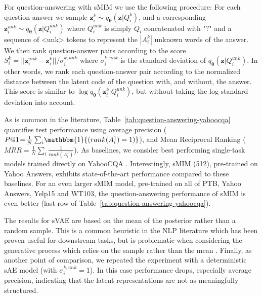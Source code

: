\documentclass{article}
\newcommand{\bs}{\boldsymbol}
\newcommand{\z}{{\bs z}}
\newcommand{\params}{{\bs \theta}}
\newcommand{\penc}{q}
\newcommand{\Menc}{\penc_{\params}}
\begin{document}
For question-answering with sMIM we use the following procedure:
For each question-answer we sample $\z_i^k \sim \Menc(\z|Q_i^k)$, and a corresponding 
$\z_i^{unk} \sim \Menc(\z|Q_i^{unk})$ where $Q_i^{unk}$ is simply $Q_i$ concatenated 
with "?" and a sequence of <unk> tokens to represent the $|A_i^k|$ unknown words of the answer.
We then rank question-answer pairs according to the score
$S_i^k = ||\z_i^{unk} - \z_i^k|| / \sigma_i^{k,unk}$
where $\sigma_i^{k,unk}$ is the standard deviation of $\Menc(\z|Q_i^{unk})$. 
In other words, we rank each question-answer pair according to the normalized distance between  
the latent code of the question with, and without, the answer. This score is similar 
to  $\log \Menc(\z_i^k|Q_i^{unk})$, but without taking the log standard deviation into account. 

As is common in the literature, Table\ \ref{tab:question-answering-yahoocqa} quantifies test performance 
using average precision 
($P@1 \!=\! \frac{1}{N} \sum_i\! \mathbbm{1}{(rank(A_i^1) = 1)}$), 
and Mean Reciprocal Ranking ($MRR = \frac{1}{N} \sum_i \frac{1}{rank(A_i^1)}$).
As baselines, we consider best performing single-task models trained directly on YahooCQA \citep{DBLP:journals/corr/SantosTXZ16,DBLP:journals/corr/TayLH17a}.
Interestingly, sMIM (512), pre-trained on Yahoo Answers, exhibits state-of-the-art 
performance compared to these baselines.
For an even larger sMIM model, pre-trained on all of PTB, Yahoo Answers, Yelp15
and WT103, the question-answering performance of sMIM is even better
(last row of Table\ \ref{tab:question-answering-yahoocqa}).

The results for sVAE are based on the mean of the posterior rather than a random sample.
This is a common heuristic in the NLP literature which has been proven useful for downstream tasks, 
but is problematic when considering the generative process which relies on the sample rather than the mean \citep{bosc-vincent-2020-sequence}. 
Finally, as another point of comparison, we repeated the experiment with a 
deterministic sAE model (with $\sigma_i^{k,unk} = 1$).
In this case performance drops, especially average precision, indicating that 
the latent representations are not as meaningfully structured.
\end{document}
